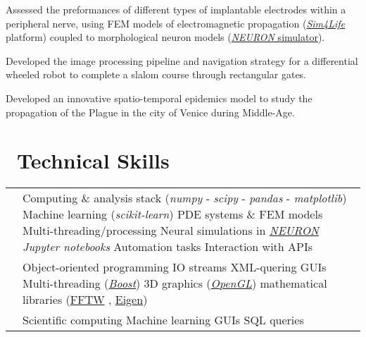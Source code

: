 \documentclass[a4paper]{cv}
\begin{document}
\begin{minipage}[t]{0.6\textwidth}
Assessed the preformances of different types of implantable electrodes within a peripheral nerve, using FEM models of electromagnetic propagation (\href{http://www.zurichmedtech.com/sim4life/}{\emph{Sim4Life}} platform) coupled to morphological neuron models (\href{https://neuron.yale.edu/neuron/}{\emph{NEURON} simulator}).
\sectionspace

Developed the image processing pipeline and navigation strategy for a differential wheeled robot to complete a slalom course through rectangular gates.
\sectionspace

Developed an innovative spatio-temporal epidemics model to study the propagation of the Plague in the city of Venice during Middle-Age.
\sectionspace

\section{\texorpdfstring{\faWrench}\ \ Technical Skills}\sectionline

\def\arraystretch{1.5}
\begin{tabular}{R{0.21\textwidth} L{0.7\textwidth}}

 & Computing \& analysis stack (\emph{numpy} - \emph{scipy} - \emph{pandas} - \emph{matplotlib}) \tbl{} Machine learning (\emph{scikit-learn}) \tbl{} PDE systems \& FEM models \tbl{} Multi-threading/processing \tbl{} Neural simulations in \href{https://neuron.yale.edu/neuron/}{\emph{NEURON}} \tbl{} \emph{Jupyter notebooks} \tbl{} Automation tasks \tbl{}Interaction with APIs\\

 & Object-oriented programming \tbl{} IO streams \tbl{} XML-quering \tbl{} GUIs \tbl{} Multi-threading (\href{https://www.boost.org/}{\emph{Boost}}) \tbl{} 3D graphics (\href{https://www.opengl.org/}{\emph{OpenGL}}) \tbl{} mathematical libraries (\href{http://fftw.org/}{FFTW} , \href{http://eigen.tuxfamily.org/index.php?title=Main_Page}{Eigen})\\

 & Scientific computing \tbl{} Machine learning \tbl{} GUIs \tbl{} SQL queries\\


\end{tabular}
\end{minipage}
\end{document}
